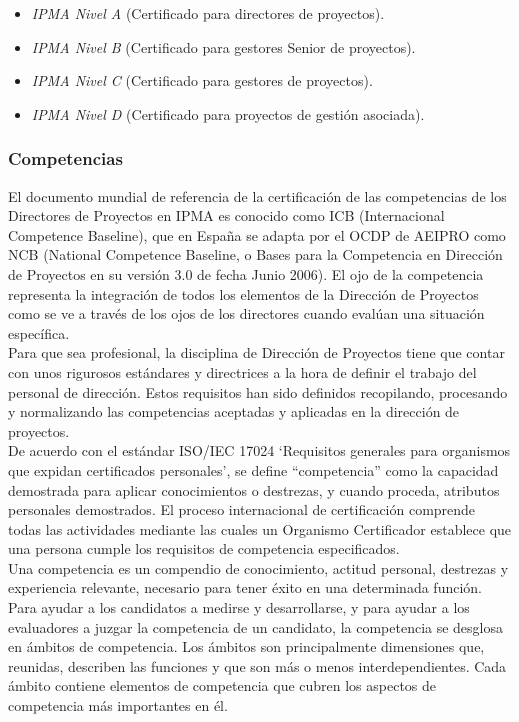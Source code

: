 \begin{itemize}
	\item \emph{IPMA Nivel A} (Certificado para directores de proyectos).
	\item \emph{IPMA Nivel B} (Certificado para gestores Senior de proyectos).
	\item \emph{IPMA Nivel C} (Certificado para gestores de proyectos).
	\item \emph{IPMA Nivel D} (Certificado para proyectos de gestión asociada).
\end{itemize}

\subsubsection{Competencias}

El documento mundial de referencia de la certificación de las competencias de los Directores de Proyectos en IPMA es conocido como ICB (Internacional Competence Baseline), que en España se adapta por el OCDP de AEIPRO como NCB (National Competence Baseline, o Bases para la Competencia en Dirección de Proyectos en su versión 3.0 de fecha Junio 2006). El ojo de la competencia representa la integración de todos los elementos de la Dirección de Proyectos como se ve a través de los ojos de los directores cuando evalúan una situación específica.\\

Para que sea profesional, la disciplina de Dirección de Proyectos tiene que contar con unos rigurosos estándares y directrices a la hora de definir el trabajo del personal de dirección. Estos requisitos han sido definidos recopilando, procesando y normalizando las competencias aceptadas y aplicadas en la dirección de proyectos.\\

De acuerdo con el estándar ISO/IEC 17024 ‘Requisitos generales para organismos que expidan certificados personales', se define “competencia” como la capacidad demostrada para aplicar conocimientos o destrezas, y cuando proceda, atributos personales demostrados. El proceso internacional de certificación comprende todas las actividades mediante las cuales un Organismo Certificador establece que una persona cumple los requisitos de competencia especificados.\\

Una competencia es un compendio de conocimiento, actitud personal, destrezas y experiencia relevante, necesario para tener éxito en una determinada función. Para ayudar a los candidatos a medirse y desarrollarse, y para ayudar a los evaluadores a juzgar la competencia de un candidato, la competencia se desglosa en ámbitos de competencia. Los ámbitos son principalmente dimensiones que, reunidas, describen las funciones y que son más o menos interdependientes. Cada ámbito contiene elementos de competencia que cubren los aspectos de competencia más importantes en él.\\

